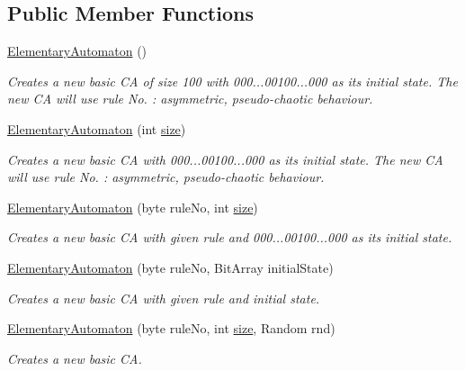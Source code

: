 \subsection*{Public Member Functions}
\begin{DoxyCompactItemize}
\item 
\hyperlink{class_cellular_1_1_elementary_automaton_a3102fe9e27bc0b89dd69b1c8d1298594}{Elementary\+Automaton} ()
\begin{DoxyCompactList}\small\item\em Creates a new basic C\+A of size 100 with 000...00100...000 as its initial state. The new C\+A will use rule No. \+: asymmetric, pseudo-\/chaotic behaviour. \end{DoxyCompactList}\item 
\hyperlink{class_cellular_1_1_elementary_automaton_adb0c84746e3c2d1c65010f506d010e94}{Elementary\+Automaton} (int \hyperlink{class_cellular_1_1_automaton1_d_a915129ccf0f1e7092844c99ce6a28e5b}{size})
\begin{DoxyCompactList}\small\item\em Creates a new basic C\+A with 000...00100...000 as its initial state. The new C\+A will use rule No. \+: asymmetric, pseudo-\/chaotic behaviour. \end{DoxyCompactList}\item 
\hyperlink{class_cellular_1_1_elementary_automaton_aa8326e685de0a177a5125625280fdde1}{Elementary\+Automaton} (byte rule\+No, int \hyperlink{class_cellular_1_1_automaton1_d_a915129ccf0f1e7092844c99ce6a28e5b}{size})
\begin{DoxyCompactList}\small\item\em Creates a new basic C\+A with given rule and 000...00100...000 as its initial state. \end{DoxyCompactList}\item 
\hyperlink{class_cellular_1_1_elementary_automaton_aa5d649a5cc42560eede2ac3c96199f7b}{Elementary\+Automaton} (byte rule\+No, Bit\+Array initial\+State)
\begin{DoxyCompactList}\small\item\em Creates a new basic C\+A with given rule and initial state. \end{DoxyCompactList}\item 
\hyperlink{class_cellular_1_1_elementary_automaton_a64849d809eb4962cb09b5263f3227457}{Elementary\+Automaton} (byte rule\+No, int \hyperlink{class_cellular_1_1_automaton1_d_a915129ccf0f1e7092844c99ce6a28e5b}{size}, Random rnd)
\begin{DoxyCompactList}\small\item\em Creates a new basic C\+A. \end{DoxyCompactList}\item 

\end{DoxyCompactItemize}
